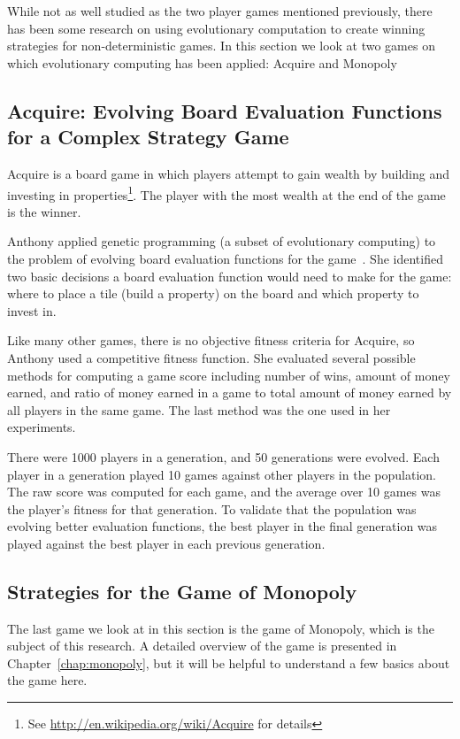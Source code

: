 While not as well studied as the two player games mentioned previously, there
has been some research on using evolutionary computation to create winning
strategies for non-deterministic games. In this section we look at two games
on which evolutionary computing has been applied: Acquire and Monopoly

\subsection{Acquire: Evolving Board Evaluation Functions for a Complex Strategy
Game}

Acquire is a board game in which players attempt to gain wealth by building and
investing in properties\footnote{See \url{http://en.wikipedia.org/wiki/Acquire}
for details}. The player with the most wealth at the end of the game is the
winner.

Anthony applied genetic programming (a subset of evolutionary computing) to the
problem of evolving board evaluation functions for the game~\cite{Anthony2002}.
She identified two basic decisions a board evaluation function would need to
make for the game: where to place a tile (build a property) on the board and
which property to invest in. 

Like many other games, there is no objective fitness criteria for Acquire, so
Anthony used a competitive fitness function. She evaluated several possible
methods for computing a game score including number of wins, amount of money
earned, and ratio of money earned in a game to total amount of money earned by
all players in the same game. The last method was the one used in her
experiments.

There were 1000 players in a generation, and 50 generations were evolved. Each
player in a generation played 10 games against other players in the population.
The raw score was computed for each game, and the average over 10 games was the
player's fitness for that generation. To validate that the population was
evolving better evaluation functions, the best player in the final generation
was played against the best player in each previous generation.

\subsection{Strategies for the Game of Monopoly}

The last game we look at in this section is the game of Monopoly, which is the
subject of this research. A detailed overview of the game is presented in
Chapter~\ref{chap:monopoly}, but it will be helpful to understand a few basics
about the game here. 

